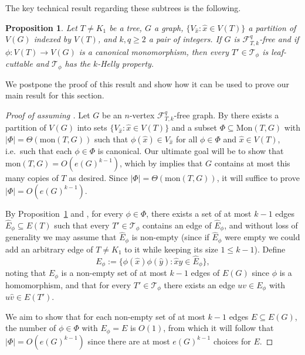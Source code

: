 \documentclass[12pt,letterpaper]{article}
\newtheorem{proposition}[theorem]{Proposition}
\theoremstyle{definition}
\newcommand{\pow}{q} %
\renewcommand{\c}[1]{\mathcal{#1}}
\newcommand{\sub}{\subseteq}
\begin{document}
	The key technical result regarding these subtrees is the following.
	
	\begin{proposition}\label{proposition:HellyTechnical}
		Let $T\ne K_1$ be a tree, $G$ a graph, $\{V_{\hat{x}}:\hat{x}\in V(T)\}$ a partition of $V(G)$ indexed by $V(T)$, and $k,\pow \ge 2$ a pair of integers.  If $G$ is $\c{F}_{T,k}^\pow$-free and if $\phi:V(T)\to V(G)$ is a canonical monomorphism, then every $T'\in \c{T}_\phi$ is leaf-cuttable and $\c{T}_\phi$ has the $k$-Helly property.
	\end{proposition}
	We postpone the proof of this result and show how it can be used to prove our main result for this section.
	
	\begin{proof}[Proof of  assuming ]
		Let $G$ be an $n$-vertex $\c{F}_{T,k}^\pow$-free graph. By  there exists a partition of $V(G)$ into sets $\{V_{\hat{x}}:\hat{x}\in V(T)\}$ and a subset $\Phi\subseteq \mathrm{Mon}(T,G)$ with $|\Phi|=\Theta(\mathrm{mon}(T,G))$ such that $\phi(\hat{x})\in V_{\hat{x}}$ for all $\phi\in \Phi$ and $\hat{x}\in V(T)$, i.e.\ such that each $\phi\in \Phi$ is canonical.  Our ultimate goal will be to show that $\mathrm{mon}(T,G)=O(e(G)^{k-1})$, which by  implies that $G$ contains at most this many copies of $T$ as desired. Since $|\Phi|=\Theta(\mathrm{mon}(T,G))$, it will suffice to prove $|\Phi|=O(e(G)^{k-1})$.  
		
		By Proposition~\ref{proposition:HellyTechnical} and , for every $\phi\in \Phi$, there exists a set of at most $k-1$ edges $\widehat{E}_\phi\sub E(T)$ such that every $T'\in \c{T}_\phi$ contains an edge of $\widehat{E}_\phi$, and without loss of generality we may assume that $\widehat{E}_\phi$ is non-empty (since if $\widehat{E}_\phi$ were empty we could add an arbitrary edge of $T\ne K_1$ to it while keeping its size $1\le k-1$).  Define 
		\[
		E_\phi:=\{\phi(\hat{x})\phi(\hat{y}):\hat{x}\hat{y}\in \widehat{E}_\phi\},
		\] 
		noting that $E_\phi$ is a non-empty set of at most $k-1$ edges of $E(G)$ since $\phi$ is a homomorphism, and that for every $T'\in \c{T}_\phi$ there exists an edge $uv\in E_\phi$ with $\hat{u}\hat{v}\in E(T')$. %
		
		We aim to show that for each non-empty set of at most $k-1$ edges $E\sub E(G)$, the number of $\phi\in \Phi$ with $E_{\phi}=E$ is $O(1)$, from which it will follow that $|\Phi|=O(e(G)^{k-1})$ since there are at most $e(G)^{k-1}$ choices for $E$.
		

\end{proof}
\end{document}
